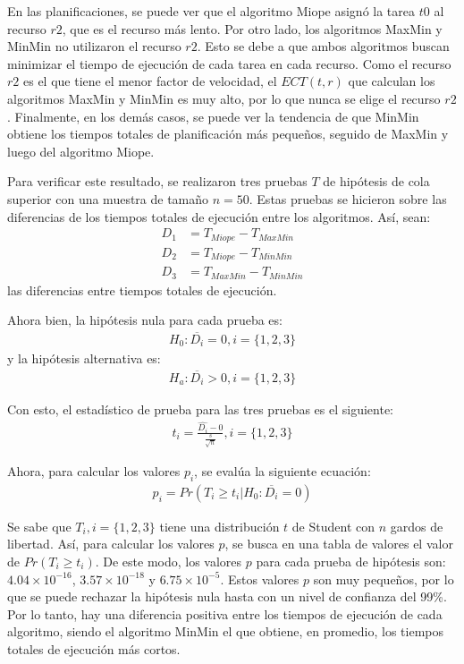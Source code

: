 En las planificaciones, se puede ver que el algoritmo Miope asignó la tarea $t0$ al recurso $r2$, que es el recurso más lento. Por otro lado, los algoritmos MaxMin y MinMin no utilizaron el recurso $r2$. Esto se debe a que ambos algoritmos buscan minimizar el tiempo de ejecución de cada tarea en cada recurso. Como el recurso $r2$ es el que tiene el menor factor de velocidad, el $ECT(t,r)$ que calculan los algoritmos MaxMin y MinMin es muy alto, por lo que nunca se elige el recurso $r2$. Finalmente, en los demás casos, se puede ver la tendencia de que MinMin obtiene los tiempos totales de planificación más pequeños, seguido de MaxMin y luego del algoritmo Miope. 

Para verificar este resultado, se realizaron tres pruebas $T$ de hipótesis de cola superior con una muestra de tamaño $n=50$. Estas pruebas se hicieron sobre las diferencias de los tiempos totales de ejecución entre los algoritmos. Así, sean:
\begin{align*}
D_1 &= T_{Miope} - T_{MaxMin}\\
D_2 &= T_{Miope} - T_{MinMin}\\
D_3 &= T_{MaxMin} - T_{MinMin}
\end{align*}
\noindent las diferencias entre tiempos totales de ejecución. 

Ahora bien, la hipótesis nula para cada prueba es:
\begin{align*}
H_0: \overline{D_i} = 0, i=\{1,2,3\}
\end{align*}
\noindent y la hipótesis alternativa es:
\begin{align*}
H_a: \overline{D_i} > 0, i=\{1,2,3\}
\end{align*}

Con esto, el estadístico de prueba para las tres pruebas es el siguiente:
\begin{align*}
t_i = \frac{\widehat{D_i} - 0}{\frac{s}{\sqrt{n}}}, i=\{1,2,3\}
\end{align*}

Ahora, para calcular los valores $p_i$, se evalúa la siguiente ecuación:
\begin{align*}
p_i = Pr(T_i \ge t_i | H_0: \overline{D_i} = 0)
\end{align*}

Se sabe que $T_i, i=\{1,2,3\}$ tiene una distribución $t$ de Student con $n$ gardos de libertad. Así, para calcular los valores $p$, se busca en una tabla de valores el valor de $Pr(T_i \ge t_i)$. De este modo, los valores $p$ para cada prueba de hipótesis son: $4.04 \times 10^{-16}$, $3.57 \times 10^{-18}$ y $6.75 \times 10^{-5}$. Estos valores $p$ son muy pequeños, por lo que se puede rechazar la hipótesis nula hasta con un nivel de confianza del 99\%. Por lo tanto, hay una diferencia positiva entre los tiempos de ejecución de cada algoritmo, siendo el algoritmo MinMin el que obtiene, en promedio, los tiempos totales de ejecución más cortos.
